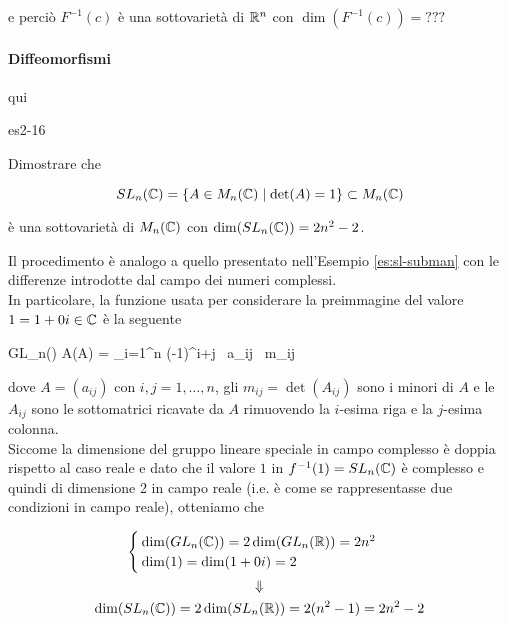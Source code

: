 {e perciò $ F^{-1}(c) $ è una sottovarietà di $ \mathbb{R}^{n} $ con $ \dim(F^{-1}(c)) = ??? $

\paragraph{Diffeomorfismi}

qui
}


{es2-16}
{
Dimostrare che

\begin{equation}
	SL_{n}(\mathbb{C}) = \{ A \in M_{n}(\mathbb{C}) \mid \det(A) = 1 \} \subset M_{n}(\mathbb{C})
\end{equation}

è una sottovarietà di $ M_{n}(\mathbb{C}) $ con $ \dim(SL_{n}(\mathbb{C})) = 2 n^{2} - 2 $.
}
{
Il procedimento è analogo a quello presentato nell'Esempio \ref{es:sl-subman} con le differenze introdotte dal campo dei numeri complessi. \\
In particolare, la funzione usata per considerare la preimmagine del valore $ 1 = 1 + 0 i \in \mathbb{C} $ è la seguente

	{GL_{n}(\C)}{\C}
	{A}{\det(A) = \sum_{i=1}^{n} (-1)^{i+j} \, a_{ij} \, m_{ij}}

dove $ A = (a_{ij}) $ con $ i,j=1,\dots,n $, gli $ m_{ij} = \det(A_{ij}) $ sono i minori di $ A $ e le $ A_{ij} $ sono le sottomatrici ricavate da $ A $ rimuovendo la $ i $-esima riga e la $ j $-esima colonna. \\
Siccome la dimensione del gruppo lineare speciale in campo complesso è doppia rispetto al caso reale e dato che il valore $ 1 $ in $ f^{-1}(1) = SL_{n}(\mathbb{C}) $ è complesso e quindi di dimensione 2 in campo reale (i.e. è come se rappresentasse due condizioni in campo reale), otteniamo che

\begin{gather}
	\begin{cases}
		\dim(GL_{n}(\C)) = 2 \dim(GL_{n}(\R)) = 2 n^{2} \\
		\dim(1) = \dim(1 + 0 i) = 2
	\end{cases} \nonumber \\
	\Downarrow \\ %
	\dim(SL_{n}(\C)) = 2 \dim(SL_{n}(\R)) = 2(n^{2} - 1) = 2 n^{2} - 2 \nonumber
\end{gather}
}


